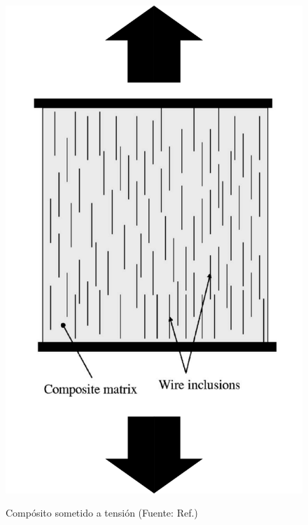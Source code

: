\documentclass[12pt,letterpaper]{article}
\numberwithin{equation}{section}
\begin{document}
\begin{minipage}{0.5\linewidth}
	\begin{figure}[H]
		\centering\includegraphics[scale=0.4]{Imagenes/matriz_tension.png}\\
		\caption{Compósito sometido a tensión (Fuente: Ref.\cite{Wire_theory_2})}
		\label{fig:matriz_tension}
	\end{figure}
\end{minipage}
\end{document}
